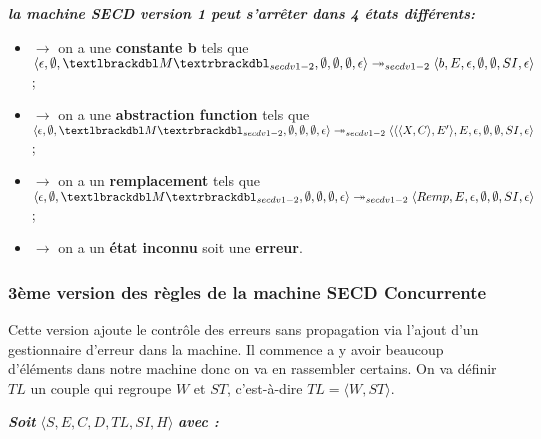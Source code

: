 \documentclass[10pt,a4paper]{article}
\begin{document}
				
				\textbf{\textit{la machine SECD version 1 peut s'arrêter dans 4 états différents:}}
				\smallbreak
				\begin{itemize}
					\item[]$\longrightarrow$ on a une \textbf{constante b} tels que $\langle \epsilon,\emptyset,\textlbrackdbl M\textrbrackdbl_{secdv1-2},\emptyset,\emptyset,\emptyset,\epsilon\rangle \twoheadrightarrow_{secdv1-2} \langle b,E,\epsilon,\emptyset,\emptyset,SI,\epsilon\rangle$;
					\item[]$\longrightarrow$ on a une \textbf{abstraction function} tels que $\langle \epsilon,\emptyset,\textlbrackdbl M\textrbrackdbl_{secdv1-2},\emptyset,\emptyset,\emptyset,\epsilon\rangle \twoheadrightarrow_{secdv1-2} \langle\langle\langle X,C\rangle,E'\rangle,E,\epsilon,\emptyset,\emptyset,SI,\epsilon\rangle$;
					\item[]$\longrightarrow$ on a un \textbf{remplacement} tels que $\langle \epsilon,\emptyset,\textlbrackdbl M\textrbrackdbl_{secdv1-2},\emptyset,\emptyset,\emptyset,\epsilon\rangle \twoheadrightarrow_{secdv1-2} \langle Remp,E,\epsilon,\emptyset,\emptyset,SI,\epsilon\rangle$;
					\item[]$\longrightarrow$ on a un \textbf{état inconnu} soit une \textbf{erreur}.
				\end{itemize}
				\newpage
				
				
			\subsubsection{3ème version des règles de la machine SECD Concurrente}\label{SECDConc3}
				\smallbreak
				Cette version ajoute le contrôle des erreurs sans propagation via l'ajout d'un gestionnaire d'erreur dans la machine. Il commence a y avoir beaucoup d'éléments dans notre machine donc on va en rassembler certains. On va définir $TL$ un couple qui regroupe $W$ et $ST$, c'est-à-dire $TL = \langle W,ST\rangle$.
				\bigbreak
					
				\textbf{\textit{Soit}} $\langle S,E,C,D,TL,SI,H\rangle$ \textbf{\textit{avec :}}
			
\end{document}

